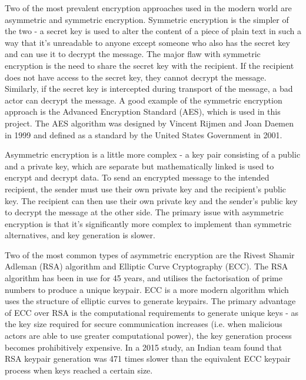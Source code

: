 \documentclass{mproj}
\begin{document}
Two of the most prevalent encryption approaches used in the modern world are asymmetric and symmetric encryption. Symmetric encryption is the simpler of the two - a secret key is used to alter the content of a piece of plain text in such a way that it's unreadable to anyone except someone who also has the secret key and can use it to decrypt the message. The major flaw with symmetric encryption is the need to share the secret key with the recipient. If the recipient does not have access to the secret key, they cannot decrypt the message. Similarly, if the secret key is intercepted during transport of the message, a bad actor can decrypt the message. A good example of the symmetric encryption approach is the Advanced Encryption Standard (AES), which is used in this project. The AES algorithm was designed by Vincent Rijmen and Joan Daemen in 1999 and defined as a standard by the United States Government in 2001.

Asymmetric encryption is a little more complex - a key pair consisting of a public and a private key, which are separate but mathematically linked is used to encrypt and decrypt data. To send an encrypted message to the intended recipient, the sender must use their own private key and the recipient's public key. The recipient can then use their own private key and the sender's public key to decrypt the message at the other side. The primary issue with asymmetric encryption is that it's significantly more complex to implement than symmetric alternatives, and key generation is slower.

Two of the most common types of asymmetric encryption are the Rivest Shamir Adleman (RSA) algorithm\cite{rivest2019method} and Elliptic Curve Cryptography (ECC)\cite{lopez2000overview}. The RSA algorithm has been in use for 45 years, and utilises the factorisation of prime numbers to produce a unique keypair. ECC is a more modern algorithm which uses the structure of elliptic curves to generate keypairs. The primary advantage of ECC over RSA is the computational requirements to generate unique keys - as the key size required for secure communication increases (i.e. when malicious actors are able to use greater computational power), the key generation process becomes prohibitively expensive. In a 2015 study, an Indian team found that RSA keypair generation was 471 times slower than the equivalent ECC keypair process when keys reached a certain size\cite{gobi2015comparative}.
\end{document}
